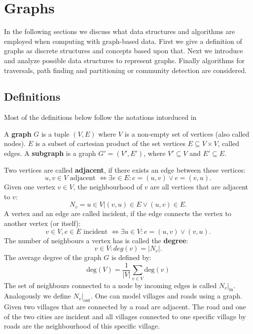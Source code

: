 \chapter{Graphs}\label{\positionnumber}
    In the following sections we discuss what data structures and algorithms are employed when computing with graph-based data.
    First we give a definition of graphs as discrete structures and concepts based upon that. 
    Next we introduce and analyze possible data structures to represent graphs. 
    Finally algorithms for traversals, path finding and partitioning or community detection are considered.
    
    \section{Definitions}\label{\positionnumber}
        Most of the definitions below follow the notations intorduced in ~\autocite{steger2007diskrete, Gross1998GraphTA, aho1974design, cormen2009introduction, Goodrich2014AlgorithmDA}
    
        A \textbf{graph} $G$ is a tuple $(V, E)$ where $V$ is a non-empty set of vertices (also called nodes). 
        $E$ is a subset of cartesian product of the set vertices $E \subseteq V \times V$, called edges.
        A \textbf{subgraph} is a graph $G' = (V', E')$, where $V' \subseteq V$ and $E' \subseteq E$. 
        
        Two vertices are called \textbf{adjacent}, if there exists an edge between these vertices: 
        \[ u,v \in V \text{ adjacent } \Leftrightarrow \exists e \in E: e = (u, v) \vee e= (v, u).\]
        Given one vertex $v \in V$, the neighbourhood of $v$ are all vertices that are adjacent to $v$: 
        \[N_v = {u \in V | (v, u) \in E \vee (u, v) \in E}.\] 
        A vertex and an edge are called incident, if the edge connects the vertex to another vertex (or itself): 
        \[v \in V, e\in E \text{ incident } \Leftrightarrow \exists u \in V: e = (u,v) \vee (v,u).\]
        The number of neighbours a vertex has is called the \textbf{degree}: 
        \[v \in V: deg(v) = |N_v|.\]
        The average degree of the graph $G$ is defined by:
        \[ \text{deg}(V) = \frac{1}{|V|} \sum_{v \in V}\text{deg}(v)\]
        The set of neighbours connected to a node by incoming edges is called $N_v |_\text{in}$. Analogously we define $N_v |_\text{out}$.             
        One can model villages and roads using a graph. 
        Given two villages that are connected by a road are adjacent. 
        The road and one of the two cities are incident and all villages connected to one specific village by roads are the neighbourhood of this specific village. 
        
